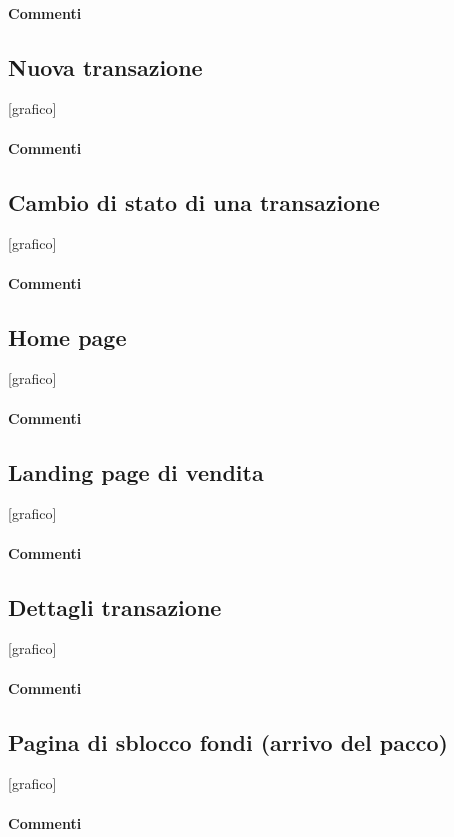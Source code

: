 \documentclass[a4paper, 12pt]{article}
\begin{document}
\paragraph{Commenti}

\subsection{Nuova transazione}
[grafico]
\paragraph{Commenti}

\subsection{Cambio di stato di una transazione}
[grafico]
\paragraph{Commenti}

\subsection{Home page}
[grafico]
\paragraph{Commenti}

\subsection{Landing page di vendita}
[grafico]
\paragraph{Commenti}

\subsection{Dettagli transazione}
[grafico]
\paragraph{Commenti}

\subsection{Pagina di sblocco fondi (arrivo del pacco)}
[grafico]
\paragraph{Commenti}
\end{document}
